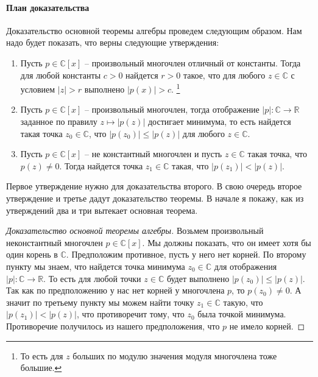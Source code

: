 \paragraph{План доказательства}

Доказательство основной теоремы алгебры проведем следующим образом.
Нам надо будет показать, что верны следующие  утверждения:
\begin{enumerate}
\item Пусть $p\in \mathbb C[x]$ -- произвольный многочлен отличный от константы.
Тогда для любой константы $c > 0$ найдется $r > 0$ такое, что для любого $z\in\mathbb C$ с условием $|z| > r$ выполнено $|p(x)| > c$.%
\footnote{То есть для $z$ больших по модулю значения модуля многочлена тоже большие.}

\item Пусть $p\in \mathbb C[x]$ -- произвольный многочлен, тогда отображение $|p|\colon \mathbb C\to \mathbb R$ заданное по правилу $z\mapsto |p(z)|$ достигает минимума, то есть найдется такая точка $z_0\in\mathbb C$, что $|p(z_0)|\leqslant |p(z)|$ для любого $z\in \mathbb C$.

\item Пусть $p\in \mathbb C[x]$ -- не константный многочлен и пусть $z\in \mathbb C$ такая точка, что $p(z) \neq 0$.
Тогда найдется точка $z_1\in \mathbb C$ такая, что $|p(z_1)| < |p(z)|$.
\end{enumerate}

Первое утверждение нужно для доказательства второго.
В свою очередь второе утверждение и третье дадут доказательство теоремы.
В начале я покажу, как из утверждений два и три вытекает основная теорема.

\begin{proof}
[Доказательство основной теоремы алгебры]
Возьмем произвольный неконстантный многочлен $p\in\mathbb C[x]$.
Мы должны показать, что он имеет хотя бы один корень в $\mathbb C$.
Предположим противное, пусть у него нет корней.
По второму пункту мы знаем, что найдется точка минимума $z_0\in\mathbb C$ для отображения $|p|\colon \mathbb C\to \mathbb R$.
То есть для любой точки $z\in\mathbb C$ будет выполнено $|p(z_0)|\leqslant |p(z)|$.
Так как по предположению у нас нет корней у многочлена $p$, то $p(z_0) \neq 0$.
А значит по третьему пункту мы можем найти точку $z_1\in\mathbb C$ такую, что $|p(z_1)|< |p(z)|$, что противоречит тому, что $z_0$ была точкой минимума.
Противоречие получилось из нашего предположения, что $p$ не имело корней.
\end{proof}


